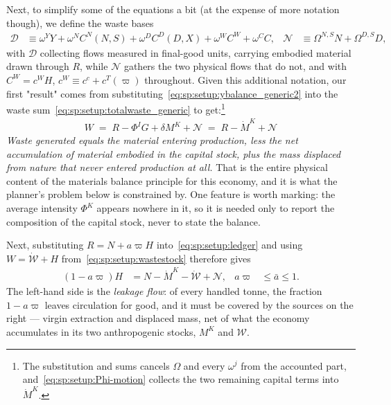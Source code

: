 Next, to simplify some of the equations a bit (at the expense of more notation though), we define the waste bases
\begin{align}
    \mathcal D &\equiv \omega^YY+\omega^{N}C^N(N,S)+\omega^{D}C^D(D,X)+\omega^WC^W+\omega^CC,
&
\mathcal N &\equiv \Omega^{N,S}N+\Omega^{D,S}D,
\label{eq:sp:setup:base}
\end{align}
with $\mathcal D$ collecting flows measured in final-good units, carrying embodied material drawn through $R$, while $\mathcal N$ gathers the two physical flows that do not, and with $C^W=c^WH$, $c^W\equiv c^c+c^T(\varpi)$ throughout. Given this additional notation, our first "result" comes from substituting~\eqref{eq:sp:setup:ybalance_generic2} into the waste sum~\eqref{eq:sp:setup:totalwaste_generic} to get:\footnote{The substitution and sums cancels $\Omega$ and every $\omega^j$ from the accounted part, and~\eqref{eq:sp:setup:Phi-motion} collects the two remaining capital terms into $\dot M^K$.}
\begin{align}
\boxed{\;W \;=\; R-\Phi^IG+\delta M^K+\mathcal N \;=\; R-\dot M^K+\mathcal N\;}
\label{eq:sp:setup:ledger}
\end{align}
\emph{Waste generated equals the material entering production, less the net accumulation of material embodied in the capital stock, plus the mass displaced from nature that never entered production at all.} That is the entire physical content of the materials balance principle for this economy, and it is what the planner's problem below is constrained by. One feature is worth marking: the average intensity $\Phi^K$ appears nowhere in it, so it is needed only to report the composition of the capital stock, never to state the balance.


Next, substituting $R=N+a\varpi H$ into~\eqref{eq:sp:setup:ledger} and using $W=\dot{\mathcal W}+H$ from~\eqref{eq:sp:setup:wastestock} therefore gives
\begin{align}
\left(1-a\varpi\right)H &= N-\dot M^K-\dot{\mathcal W}+\mathcal N,
&
a\varpi&\le\bar a\le 1 .
\label{eq:sp:setup:ledger-collected}
\end{align}
The left-hand side is the \emph{leakage flow}: of every handled tonne, the fraction $1-a\varpi$ leaves circulation for good, and it must be covered by the sources on the right --- virgin extraction and displaced mass, net of what the economy accumulates in its two anthropogenic stocks, $M^K$ and $\mathcal W$.

